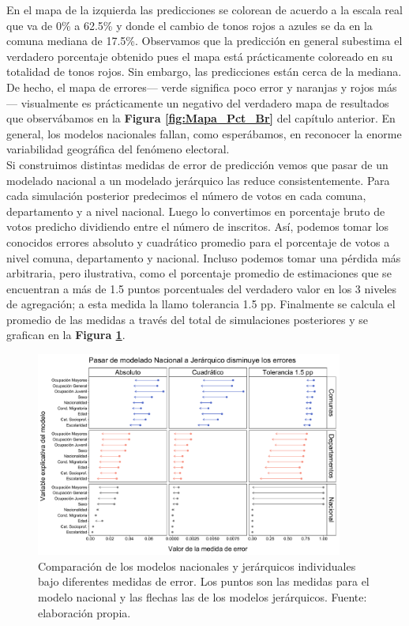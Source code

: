 En el mapa de la izquierda las predicciones se colorean de acuerdo a la escala real que va de 0\% a 62.5\% y donde el cambio de tonos rojos a azules se da en la comuna mediana de 17.5\%. Observamos que la predicción en general subestima el verdadero porcentaje obtenido pues el mapa está prácticamente coloreado en su totalidad de tonos rojos. Sin embargo, las predicciones están cerca de la mediana. De hecho, el mapa de errores--- verde significa poco error y naranjas y rojos más--- visualmente es prácticamente un negativo del verdadero mapa de resultados que observábamos en la \textbf{Figura \ref{fig:Mapa_Pct_Br}} del capítulo anterior. En general, los modelos nacionales fallan, como esperábamos, en reconocer la enorme variabilidad geográfica del fenómeno electoral.\\ 

Si construimos distintas medidas de error de predicción vemos que pasar de un modelado nacional a un modelado jerárquico las reduce consistentemente. Para cada simulación posterior predecimos el número de votos en cada comuna, departamento y a nivel nacional. Luego lo convertimos en porcentaje bruto de votos predicho dividiendo entre el número de inscritos. Así, podemos tomar los conocidos errores absoluto y cuadrático promedio para el porcentaje de votos a nivel comuna, departamento y nacional. Incluso podemos tomar una pérdida más arbitraria, pero ilustrativa, como el porcentaje promedio de estimaciones que se encuentran a más de 1.5 puntos porcentuales del verdadero valor en los 3 niveles de agregación; a esta medida la llamo tolerancia 1.5 pp. Finalmente se calcula el promedio de las medidas a través del total de simulaciones posteriores y se grafican en la \textbf{Figura \ref{fig:Errores_Modelos_Individuales}}.\\ 

\begin{figure}
	\centering
	\includegraphics[width = 0.9\textwidth]{Figs/Modelado/Graf_Errores_Modelos_Individuales}
	\caption{Comparación de los modelos nacionales y jerárquicos individuales bajo diferentes medidas de error. Los puntos son las medidas para el modelo nacional y las flechas las de los modelos jerárquicos. Fuente: elaboración propia.}
	\label{fig:Errores_Modelos_Individuales}
\end{figure} 

